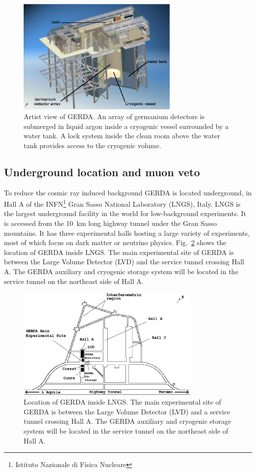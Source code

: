 \begin{figure}[tbhp]
\centering
\includegraphics[width=0.7\textwidth]{gerda}
\caption{Artist view of GERDA. An array of germanium detectors is
submerged in liquid argon inside a cryogenic vessel surrounded by a
water tank. A lock system inside the clean room above the water tank
provides access to the cryogenic volume.}
\label{fig:gerda}
\end{figure}

\subsection{Underground location and muon veto}
\label{sec:gerda:loca}
To reduce the cosmic ray induced background GERDA is located
underground, in Hall A of the INFN\footnote{Istituto Nazionale di
Fisica Nucleare} Gran Sasso National Laboratory (LNGS), Italy. LNGS is
the largest underground facility in the world for low-background
experiments. It is accessed from the 10~km long highway tunnel under
the Gran Sasso mountains. It has three experimental halls hosting a
large variety of experiments, most of which focus on dark matter or
neutrino physics. Fig.~\ref{fig:lngs} shows the location of GERDA
inside LNGS. The main experimental site of GERDA is between the Large
Volume Detector (LVD) and the service tunnel crossing Hall A. The
GERDA auxiliary and cryogenic storage system will be located in the
service tunnel on the northeast side of Hall A.

\begin{figure}[tbhp]
\centering
\includegraphics[width=0.8\textwidth]{lngs}  
\caption{Location of GERDA inside LNGS. The main experimental site of
GERDA is between the Large Volume Detector (LVD) and a service tunnel
crossing Hall A. The GERDA auxiliary and cryogenic storage system will
be located in the service tunnel on the northeast side of Hall A.}
\label{fig:lngs}
\end{figure}

